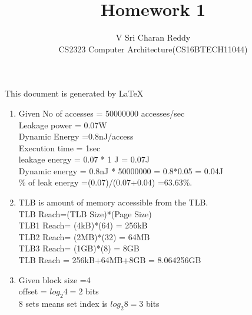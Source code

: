 \documentclass[12pt]{article}
\begin{document}
 
 
\title{Homework 1}%
\author{V Sri Charan Reddy\\ %
CS2323 Computer Architecture(CS16BTECH11044)} %
\maketitle
	This document is generated by \LaTeX
\begin{enumerate}

	\item      Given No of accesses = 50000000 accesses/sec\\
	          Leakage power = 0.07W\\
              Dynamic Energy =0.8nJ/access \\
	          Execution time = 1sec\\
              leakage energy = 0.07 * 1 J = 0.07J\\
	          Dynamic energy = 0.8nJ * 50000000 = 0.8*0.05 = 0.04J\\
				\% of leak energy =(0.07)/(0.07+0.04)
				=63.63\%.\\
	\item TLB is amount of memory accessible from the TLB.\\
	TLB Reach=(TLB Size)*(Page Size)\\
	TLB1 Reach= (4kB)*(64) = 256kB\\
	TLB2 Reach= (2MB)*(32) = 64MB \\
	TLB3 Reach= (1GB)*(8)  = 8GB \\
	TLB Reach = 256kB+64MB+8GB = 8.064256GB\\
	\item Given block size =4\\
	offset = $log_2 4 = 2$ bits\\ 
	8 sets means set index is $log_2 8 =3$ bits\\
	

\end{enumerate}
\end{document}
